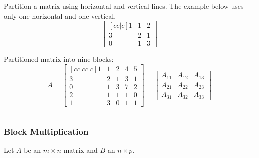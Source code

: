 \begin{example} Partition a matrix using horizontal and vertical lines.  The example below uses only one horizontal and one vertical.
\[ \begin{bmatrix}[cc|c]  
  	1  &   1 &    2 \\
     	3  &    2  &    1\\
	\hline
     	0  &    1   &  3
     \end{bmatrix}  \]	
\end{example}
 
\begin{example} Partitioned matrix into nine blocks:
\[ A = \begin{bmatrix}[cc|cc|c]  
  	1  &   1 &    2 & 4 & 5 \\
     	3  &    2  &    1 & 3 & 1 \\
	\hline
     	0  &    1   &  3 & 7 & 2 \\ 
	2  &    1   &  1 & 1 & 0 \\ 
	\hline
	1  &   3   &  0 & 1 & 1
     \end{bmatrix}  = \begin{bmatrix} A_{11} &  A_{12} &  A_{13} \\  A_{21} &  A_{22} &  A_{23} \\  A_{31} &  A_{32} &  A_{33} \end{bmatrix} \]	
\end{example}


  

\rule[0.01in]{\textwidth}{0.0025in}






\subsubsection*{Block Multiplication}
Let $A$ be an $m \times n$ matrix and $B$ an $n \times p$. 

